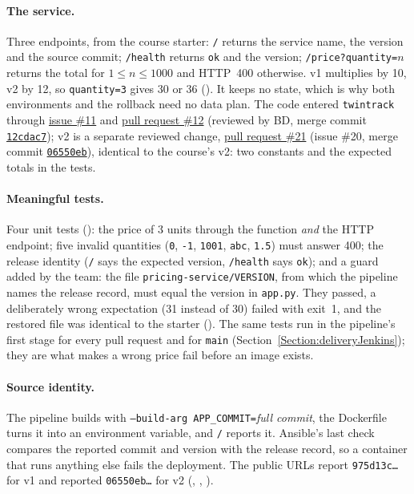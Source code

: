 \paragraph{The service.} Three endpoints, from the course starter: \texttt{/} returns the service name, the version and the source commit; \texttt{/health} returns \texttt{ok} and the version; \texttt{/price?quantity=}$n$ returns
the total for $1 \le n \le 1000$ and HTTP~400 otherwise. v1 multiplies by 10, v2 by 12, so \texttt{quantity=3} gives 30 or 36 (). It keeps no state, which is why both environments and the rollback need no data plan.
The code entered \texttt{twintrack} through \href{\GiteaRepoURL/issues/11}{issue \#11} and \href{\GiteaRepoURL/pulls/12}{pull request \#12} (reviewed by BD, merge commit \href{\GiteaRepoURL/commit/12cdac7}{\texttt{12cdac7}}); v2 is a separate reviewed change,
\href{\GiteaRepoURL/pulls/21}{pull request \#21} (issue \#20, merge commit \href{\GiteaRepoURL/commit/06550eb4fe5d3315b31e1a1bd2fe1b4f034af77f}{\texttt{06550eb}}), identical to the course's v2: two constants and the expected totals in the tests.

\paragraph{Meaningful tests.} Four unit tests (): the price of 3 units through the function \emph{and} the HTTP endpoint; five invalid quantities (\texttt{0}, \texttt{-1}, \texttt{1001}, \texttt{abc}, \texttt{1.5}) must answer 400;
the release identity (\texttt{/} says the expected version, \texttt{/health} says \texttt{ok}); and a guard added by the team: the file \texttt{pricing-service/VERSION}, from which the pipeline names the release record, must equal the version
in \texttt{app.py}. They passed, a deliberately wrong expectation (31 instead of 30) failed with exit~1, and the restored file was identical to the starter (). The same tests run in the pipeline's first stage for every pull request and for \texttt{main}
(Section~\ref{Section:deliveryJenkins}); they are what makes a wrong price fail before an image exists.

\paragraph{Source identity.} The pipeline builds with \texttt{--build-arg APP\_COMMIT=}\emph{full commit}, the Dockerfile turns it into an environment variable, and \texttt{/} reports it. Ansible's last check compares the reported commit and version with the release record,
so a container that runs anything else fails the deployment. The public URLs report \texttt{975d13c\ldots} for v1 and reported \texttt{06550eb\ldots} for v2 (, , ).

